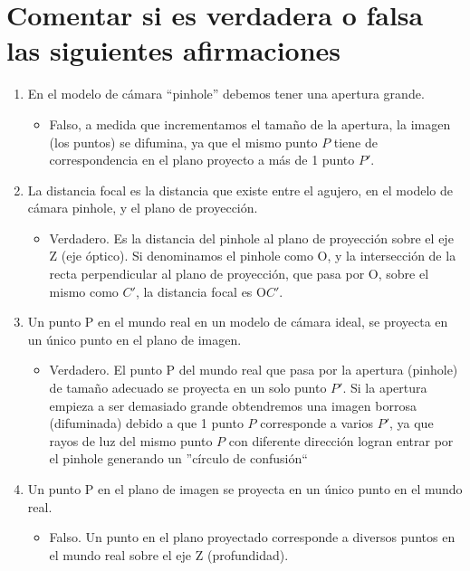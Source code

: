 \documentclass[12pt,letterpaper]{article}
\begin{document}
\section{Comentar si es verdadera o falsa las siguientes afirmaciones}
\begin{enumerate}
    \item En el modelo de cámara ``pinhole'' debemos tener una apertura grande.
        \begin{itemize}
            \item Falso, a medida que incrementamos el tamaño de la apertura,  la imagen (los puntos) se difumina, ya que el mismo punto $P$ tiene de correspondencia en el plano proyecto a más de 1 punto $P'$.
        \end{itemize}
    \item La distancia focal es la distancia que existe entre el agujero, en el modelo de cámara pinhole, y el plano de proyección.
        \begin{itemize}
            \item Verdadero. Es la distancia del pinhole al plano de proyección sobre el eje Z  (eje óptico). Si denominamos el pinhole como O, y la intersección de la recta perpendicular al plano de proyección, que pasa por O, sobre el mismo como $C'$, la distancia focal es O$C'$.
        \end{itemize}
    \item Un punto P en el mundo real en un modelo de cámara ideal, se proyecta en un único punto en el plano de imagen.
        \begin{itemize}
            \item Verdadero. El punto P del mundo real que pasa por la apertura (pinhole) de tamaño adecuado se proyecta en un solo punto $P'$. Si la apertura empieza a ser demasiado grande obtendremos una imagen borrosa (difuminada) debido a que 1 punto $P$ corresponde a varios $P'$, ya que rayos de luz del mismo punto $P$ con diferente dirección logran entrar por el pinhole generando un ''círculo de confusión``
        \end{itemize}
    \item Un punto P en el plano de imagen se proyecta en un único punto en el mundo real.
        \begin{itemize}
            \item Falso. Un punto en el plano proyectado corresponde a diversos puntos en el mundo real sobre el eje Z (profundidad).
        \end{itemize}
\end{enumerate}
\end{document}

